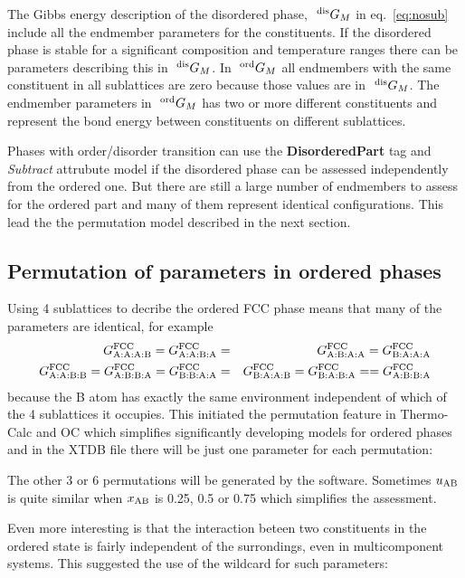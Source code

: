 \documentclass{article}
\begin{document}
\begin{appendices}
The Gibbs energy description of the disordered phase, $~^{\rm dis}G_M$
in eq.~\ref{eq:nosub} include all the endmember parameters for the
constituents.  If the disordered phase is stable for a significant
composition and temperature ranges there can be parameters describing
this in $~^{\rm dis}G_M$.  In $~^{\rm ord}G_M$ all endmembers with the
same constituent in all sublattices are zero because those values are
in $~^{\rm dis}G_M$.  The endmember parameters in $~^{\rm ord}G_M$ has
two or more different constituents and represent the bond energy
between constituents on different sublattices.

Phases with order/disorder transition can use the {\bf DisorderedPart}
tag and {\em Subtract} attrubute model if the disordered phase can be
assessed independently from the ordered one.  But there are still a
large number of endmembers to assess for the ordered part and many of
them represent identical configurations.  This lead the the
permutation model described in the next section.

\subsection{Permutation of parameters in ordered phases}\label{sec:permut}

Using 4 sublattices to decribe the ordered FCC phase means that
many of the parameters are identical, for example
\begin{eqnarray}
G^{\rm FCC}_{\rm A:A:A:B} = G^{\rm FCC}_{\rm A:A:B:A} &=& G^{\rm FCC}_{\rm A:B:A:A} = G^{\rm FCC}_{\rm B:A:A:A} \label{eq:gl12}\\
G^{\rm FCC}_{\rm A:A:B:B} = G^{\rm FCC}_{\rm A:B:B:A} = G^{\rm FCC}_{\rm B:B:A:A} &=& G^{\rm FCC}_{\rm B:A:A:B} = G^{\rm FCC}_{\rm B:A:B:A} = = G^{\rm FCC}_{\rm A:B:B:A}  \label{eq:gl10}
\end{eqnarray}
because the B atom has exactly the same environment independent of
which of the 4 sublattices it occupies.  This initiated the
permutation feature in Thermo-Calc and OC which simplifies
significantly developing models for ordered phases and in the XTDB
file there will be just one parameter for each permutation:

The other 3 or 6 permutations will be generated by the software.
Sometimes $u_{\rm AB}$ is quite similar when $x_{\rm AB}$ is 0.25, 0.5
or 0.75 which simplifies the assessment.

Even more interesting is that the interaction beteen two constituents
in the ordered state is fairly independent of the surrondings, even in
multicomponent systems.  This suggested the use of the wildcard for
such parameters:


\end{appendices}
\end{document}
